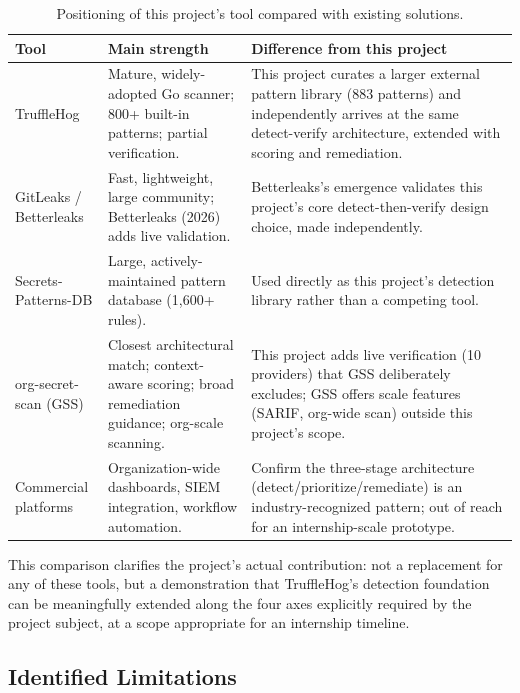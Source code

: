 \documentclass[12pt]{article}
\begin{document}
\begin{table}[h]
\centering
\begin{tabularx}{\textwidth}{|p{}|p{}|Y|}
\hline
\textbf{Tool} & \textbf{Main strength} & \textbf{Difference from this project} \\
\hline
TruffleHog & Mature, widely-adopted Go scanner; 800+ built-in patterns; partial verification. & This project curates a larger external pattern library (883 patterns) and independently arrives at the same detect-verify architecture, extended with scoring and remediation. \\
GitLeaks / Betterleaks & Fast, lightweight, large community; Betterleaks (2026) adds live validation. & Betterleaks's emergence validates this project's core detect-then-verify design choice, made independently. \\
Secrets-Patterns-DB & Large, actively-maintained pattern database (1,600+ rules). & Used directly as this project's detection library rather than a competing tool. \\
org-secret-scan (GSS) & Closest architectural match; context-aware scoring; broad remediation guidance; org-scale scanning. & This project adds live verification (10 providers) that GSS deliberately excludes; GSS offers scale features (SARIF, org-wide scan) outside this project's scope. \\
Commercial platforms & Organization-wide dashboards, SIEM integration, workflow automation. & Confirm the three-stage architecture (detect/prioritize/remediate) is an industry-recognized pattern; out of reach for an internship-scale prototype. \\
\hline
\end{tabularx}
\caption{Positioning of this project's tool compared with existing solutions.}
\label{tab:tool-positioning}
\end{table}

This comparison clarifies the project's actual contribution: not a replacement for any of these tools, but a demonstration that TruffleHog's detection foundation can be meaningfully extended along the four axes explicitly required by the project subject, at a scope appropriate for an internship timeline.

\subsection{Identified Limitations}
\end{document}
